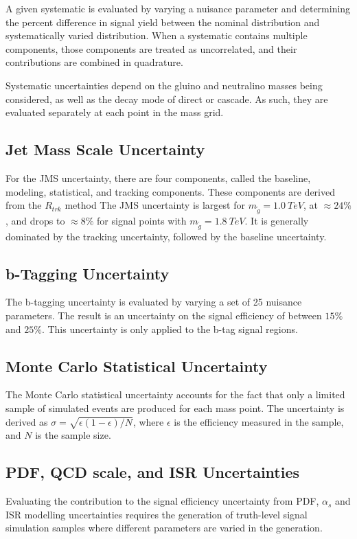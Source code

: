 A given systematic is evaluated by varying a nuisance parameter and
determining the percent difference in signal yield between the nominal
distribution and systematically varied distribution.
When a systematic contains multiple components, those components are treated as
uncorrelated, and their contributions are combined in quadrature.

Systematic uncertainties depend on the gluino and neutralino masses
being considered, as well as the decay mode of direct or cascade. As
such, they are evaluated separately at each point in the mass grid.

\subsection{Jet Mass Scale Uncertainty}\label{subsec:signal_jms_uncertainty}
For the JMS uncertainty, there are four components, called the
baseline, modeling, statistical, and tracking components.
These components are derived from the $R_{trk}$ method\cite{jet-substructure-perf}
The JMS uncertainty is largest for $m_{\tilde{g}}=1.0~TeV$, at $\approx 24\%$, and drops to $\approx 8\%$
for signal points with $m_{\tilde{g}}=1.8~TeV$.
It is generally dominated by the tracking uncertainty, followed by the baseline uncertainty.

\subsection{b-Tagging Uncertainty}\label{subsec:signal_btag_uncertainty}
The b-tagging uncertainty is evaluated by varying a set of 25 nuisance parameters.
The result is an uncertainty on the signal efficiency of between $15\%$ and $25\%$.
This uncertainty is only applied to the b-tag signal regions.

\subsection{Monte Carlo Statistical Uncertainty}\label{subsec:signal_mc_uncertainty}
The Monte Carlo statistical uncertainty accounts for the fact that only a limited sample of simulated events are
produced for each mass point.
The uncertainty is derived as $\sigma=\sqrt{\epsilon(1-\epsilon)/N}$, where $\epsilon$ is the
efficiency measured in the sample, and $N$ is the sample size.


\subsection{PDF, QCD scale, and ISR Uncertainties}\label{subsec:signal_qcd_uncertainty}
Evaluating the contribution to the signal efficiency uncertainty from PDF, $\alpha_s$ and ISR modelling uncertainties
requires the generation of truth-level signal simulation samples where different parameters are varied in the generation.

